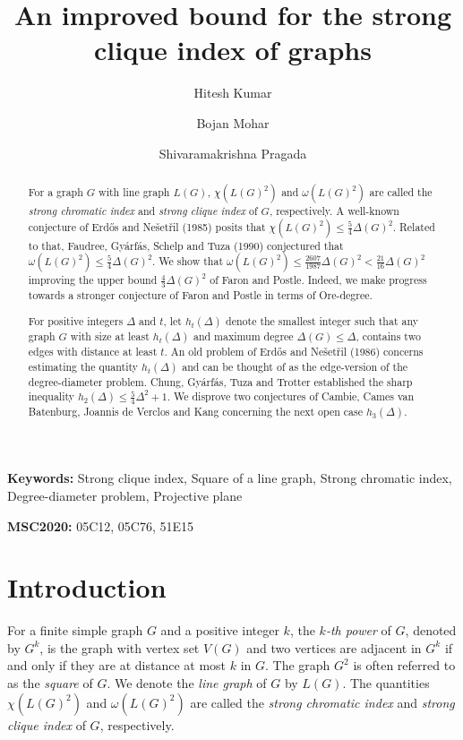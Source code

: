 \documentclass[11pt]{article}
\title{\textbf{An improved bound for the strong clique index of graphs}}
\author{Hitesh Kumar \and Bojan Mohar \and Shivaramakrishna Pragada}
\date{}
\theoremstyle{plain}
\numberwithin{equation}{section}
\begin{document}
\maketitle
\begin{abstract} For a graph $G$ with line graph $L(G)$, $\chi(L(G)^2)$ and $\omega(L(G)^2)$ are called the \emph{strong chromatic index} and \emph{strong clique index} of $G$, respectively. A well-known conjecture of Erd\H{o}s and Ne\v{s}et\v{r}il (1985) posits that $\chi(L(G)^2)\le \frac{5}{4}\Delta(G)^2$. Related to that, 
 Faudree, Gy\'{a}rf\'{a}s, Schelp and Tuza (1990) conjectured that $\omega(L(G)^2) \le \frac{5}{4}\Delta(G)^2$. We show that $\omega(L(G)^2) \le \frac{2607}{1987}\Delta(G)^2 < \frac{21}{16}\Delta(G)^2$ improving the upper bound $\frac{4}{3}\Delta(G)^2$ of Faron and Postle. Indeed, we make progress towards a stronger conjecture of Faron and Postle in terms of Ore-degree. 

 For positive integers $\Delta$ and $t$, let $h_t(\Delta)$ denote the smallest integer such that any graph $G$ with size at least $h_t(\Delta)$ and maximum degree $\Delta(G)\le \Delta$, contains two edges with distance at least $t$. An old problem of Erd\H{o}s and Ne\v{s}et\v{r}il (1986) concerns estimating the quantity $h_t(\Delta)$ and can be thought of as the edge-version of the degree-diameter problem. Chung, Gy\'{a}rf\'{a}s, Tuza and Trotter established the sharp inequality $h_2(\Delta)\le \frac{5}{4}\Delta^2+1$. We disprove two conjectures of Cambie, Cames van Batenburg, Joannis de Verclos and Kang concerning the next open case $h_3(\Delta)$. 
\end{abstract}

\noindent
\textbf{Keywords:} Strong clique index, Square of a line graph, Strong chromatic index, Degree-diameter problem, Projective plane

\noindent
\textbf{MSC2020:} 05C12, 05C76, 51E15

\section{Introduction}

For a finite simple graph $G$ and a positive integer $k$, the \emph{$k$-th power} of $G$, denoted by $G^k$, is the graph with vertex set $V(G)$ and two vertices are adjacent in $G^k$ if and only if they are at distance at most $k$ in $G$. The graph $G^2$ is often referred to as the \emph{square} of $G$. We denote the \emph{line graph} of $G$ by $L(G)$. The quantities $\chi(L(G)^2)$ and $\omega(L(G)^2)$ are called the \emph{strong chromatic index} and \emph{strong clique index} of $G$, respectively. 
\end{document}

